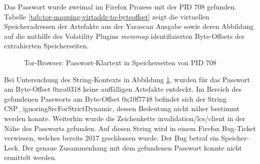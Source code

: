 \begin{table}[h!]
	\centering
	\caption{Tor-Browser: Abbildung der virtuellen Speicheradressen der gefundenen Strings im RAM auf Byte-Offsets der entsprechenden Speicherseiten}
	\label{tab:tor-mapping-virtaddr-to-byteoffset}
\end{table}

Das Passwort wurde zweimal im Firefox Prozess mit der PID 708 gefunden. Tabelle \ref{tab:tor-mapping-virtaddr-to-byteoffset} zeigt die virtuellen Speicheradressen der Artefakte aus der Yarascan Ausgabe sowie deren Abbildung auf die mithilfe des Volatility Plugins \textit{memmap} identifizierten Byte-Offsets der extrahierten Speicherseiten.


\begin{figure}[h!]
	\centering
	\hfill
	\caption{Tor-Browser: Passwort-Klartext in Speicherseiten von PID 708}
	\label{img:firefox-pw-offset-pid-708}  
\end{figure}
Bei Untersuchung des String-Kontexts in Abbildung \ref{img:firefox-pw-offset-pid-708}, wurden für das Passwort am Byte-Offset 0xea0318 keine auffälligen Artefakte entdeckt.
Im Bereich des gefundenen Passworts am Byte-Offset 0x10f7748 befindet sich der String \glqq{}CSP\_ignoringSrcForStrictDynamic\grqq{}, dessen Bedeutung nicht näher bestimmt werden konnte.
Weiterhin wurde die Zeichenkette \glqq{}invalidation/lcs/client\grqq{} in der Nähe des Passworts gefunden. Auf diesen String wird in einem Firefox Bug-Ticket verwiesen, welches bereits 2017 geschlossen wurde. Der Bug betraf ein Speicher-Leck. \cite{Bugzilla.05.06.2023} Der genaue Zusammenhang mit dem gefundenen Passwort konnte nicht ermittelt werden. 
	
